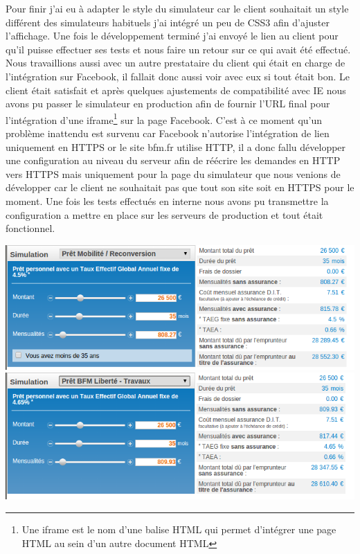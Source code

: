 \documentclass[a4paper,11pt,twoside]{report}
\begin{document}
      Pour finir j'ai eu à adapter le style du simulateur car le client souhaitait un style différent des simulateurs habituels j'ai intégré un peu de CSS3 afin d'ajuster l'affichage. Une fois le développement terminé j'ai envoyé le lien au client pour qu'il puisse effectuer ses tests et nous faire un retour sur ce qui avait été effectué. Nous travaillions aussi avec un autre prestataire du client qui était en charge de l'intégration sur Facebook, il fallait donc aussi voir avec eux si tout était bon. Le client était satisfait et après quelques ajustements de compatibilité avec IE nous avons pu passer le simulateur en production afin de fournir l'URL final pour l'intégration d'une iframe\footnote{Une iframe est le nom d'une balise HTML qui permet d'intégrer une page HTML au sein d'un autre document HTML} sur la page Facebook. C'est à ce moment qu'un problème inattendu est survenu car Facebook n'autorise l'intégration de lien uniquement en HTTPS or le site bfm.fr utilise HTTP, il a donc fallu développer une configuration au niveau du serveur afin de réécrire les demandes en HTTP vers HTTPS mais uniquement pour la page du simulateur que nous venions de développer car le client ne souhaitait pas que tout son site soit en HTTPS pour le moment. Une fois les tests effectués en interne nous avons pu transmettre la configuration a mettre en place sur les serveurs de production et tout était fonctionnel.
      \label{global_loan_simulator_3}
      
      \begin{center}
	\includegraphics[width=\textwidth]{images/global_simulator1.png} 
	\includegraphics[width=\textwidth]{images/global_simulator2.png} 
	\label{global_simulator1}
      \end{center}
\end{document}
